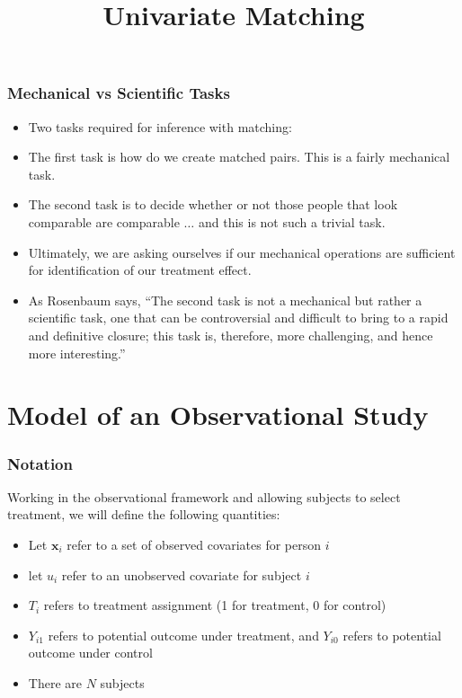 \documentclass{beamer}
\title{Univariate Matching}
\begin{document}

\frame{\titlepage}

\begin{frame}[c]\frametitle{Mechanical vs Scientific Tasks}
	\begin{itemize}
		\item<+-> Two tasks required for inference with matching:
		\item<+-> The first task is how do we create matched pairs.  This is a fairly mechanical task.  
		\item<+-> The second task is to decide whether or not those people that look comparable are comparable $\dots$ and this is not such a trivial task. 
		\item<+-> Ultimately, we are asking ourselves if our mechanical operations are sufficient for identification of our treatment effect. 
		\item<+->  As Rosenbaum says, ``The second task is not a mechanical but rather a scientific task, one that can be controversial and difficult to bring to a rapid and definitive closure; this task is, therefore, more challenging, and hence more interesting.''
	\end{itemize}
	
\end{frame}
\section{Model of an Observational Study} %
\label{sec:a_model_of_an_observational_study}

\begin{frame}[c]\frametitle{Notation}
	Working in the observational framework and allowing subjects to select treatment, we will define the following quantities:
	\begin{itemize}
		\item<+-> Let $\mathbf{x}_i$ refer to a set of observed covariates for person $i$
		\item<+-> let $u_i$ refer to an unobserved covariate for subject $i$
		\item<+->  $T_i$ refers to treatment assignment (1 for treatment, 0 for control)
		\item<+-> $Y_{i1}$ refers to potential outcome under treatment, and $Y_{i0}$ refers to potential outcome under control
		\item<+-> There are $N$ subjects
	\end{itemize}
\end{frame}
\end{document}
